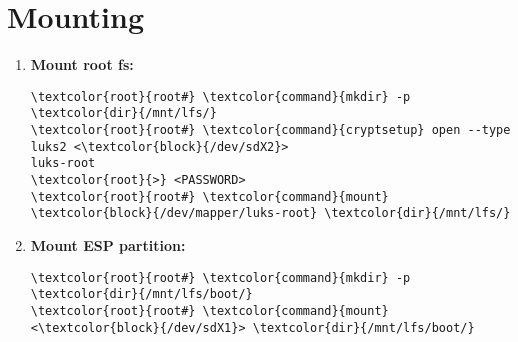 \documentclass[10pt, a4paper, onecolumn, oneside, titlepage, openany]{book}
\begin{document}
\section{Mounting}
\begin{enumerate}
    \item \textbf{Mount root fs:}
\begin{Verbatim}[commandchars=\\\{\}]
\textcolor{root}{root#} \textcolor{command}{mkdir} -p \textcolor{dir}{/mnt/lfs/}
\textcolor{root}{root#} \textcolor{command}{cryptsetup} open --type luks2 <\textcolor{block}{/dev/sdX2}>
luks-root
\textcolor{root}{>} <PASSWORD>
\textcolor{root}{root#} \textcolor{command}{mount} \textcolor{block}{/dev/mapper/luks-root} \textcolor{dir}{/mnt/lfs/}
\end{Verbatim}
    \item \textbf{Mount ESP partition:}
\begin{Verbatim}[commandchars=\\\{\}]
\textcolor{root}{root#} \textcolor{command}{mkdir} -p \textcolor{dir}{/mnt/lfs/boot/}
\textcolor{root}{root#} \textcolor{command}{mount} <\textcolor{block}{/dev/sdX1}> \textcolor{dir}{/mnt/lfs/boot/}
\end{Verbatim}
\end{enumerate}
\end{document}
